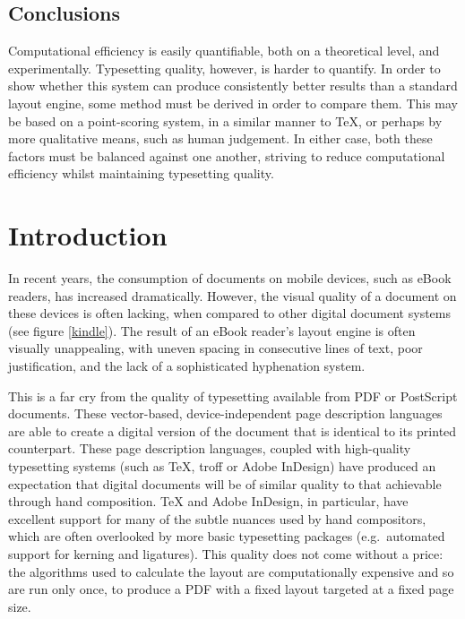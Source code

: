 

\subsection{Conclusions}
Computational efficiency is easily quantifiable, both on a theoretical level, and experimentally.
Typesetting quality, however, is harder to quantify. In order to show whether this system can
produce consistently better results than a standard \ebook{} layout engine, some method must be
derived in order to compare them. This may be based on a point-scoring system, in a similar manner
to \TeX{}\cite{Knuth1984}, or perhaps by more qualitative means, such as human judgement. In either
case, both these factors must be balanced against one another, striving to reduce computational
efficiency whilst maintaining typesetting quality.





\section{Introduction}
In recent years, the consumption of documents on mobile devices, such as eBook readers, has
increased dramatically. However, the visual quality of a document on these devices is often lacking,
when compared to other digital document systems (see figure \ref{kindle}). The result of an eBook
reader's layout engine is often visually unappealing, with uneven spacing in consecutive lines of
text, poor justification, and the lack of a sophisticated hyphenation system.

This is a far cry from the quality of typesetting available from PDF or PostScript documents. These
vector-based, de\-vice-in\-de\-pen\-d\-ent page description languages are able to create a digital
version of the document that is identical to its printed counterpart. These page description
languages, coupled with high-quality typesetting systems (such as \TeX{}, troff or Adobe InDesign)
have produced an expectation that digital documents will be of similar quality to that achievable
through hand composition. \TeX{} and Adobe InDesign, in particular, have excellent support for many
of the subtle nuances used by hand compositors, which are often overlooked by more basic typesetting
packages (e.g.~automated support for kerning and ligatures). This quality does not come without a
price: the algorithms used to calculate the layout are computationally expensive and so are run only
once, to produce a PDF with a fixed layout targeted at a fixed page size.

